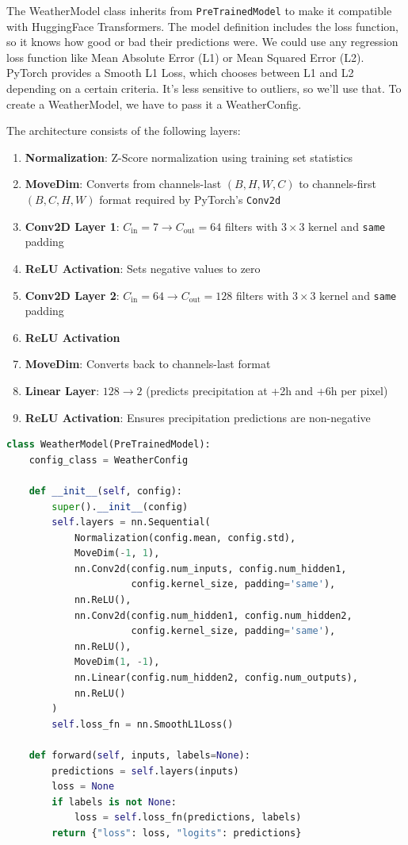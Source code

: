 \documentclass[12pt, a4paper]{report}
\begin{document}
The WeatherModel class inherits from \texttt{PreTrainedModel} to make it compatible with HuggingFace Transformers. The model definition includes the loss function, so it knows how good or bad their predictions were. We could use any regression loss function like Mean Absolute Error (L1) or Mean Squared Error (L2). PyTorch provides a Smooth L1 Loss, which chooses between L1 and L2 depending on a certain criteria. It's less sensitive to outliers, so we'll use that. To create a WeatherModel, we have to pass it a WeatherConfig.

The architecture consists of the following layers:

\begin{enumerate}
    \item \textbf{Normalization}: Z-Score normalization using training set statistics
    \item \textbf{MoveDim}: Converts from channels-last $(B, H, W, C)$ to channels-first $(B, C, H, W)$ format required by PyTorch's \texttt{Conv2d}
    \item \textbf{Conv2D Layer 1}: $C_{\text{in}} = 7 \rightarrow C_{\text{out}} = 64$ filters with $3 \times 3$ kernel and \texttt{same} padding
    \item \textbf{ReLU Activation}: Sets negative values to zero
    \item \textbf{Conv2D Layer 2}: $C_{\text{in}} = 64 \rightarrow C_{\text{out}} = 128$ filters with $3 \times 3$ kernel and \texttt{same} padding
    \item \textbf{ReLU Activation}
    \item \textbf{MoveDim}: Converts back to channels-last format
    \item \textbf{Linear Layer}: $128 \rightarrow 2$ (predicts precipitation at +2h and +6h per pixel)
    \item \textbf{ReLU Activation}: Ensures precipitation predictions are non-negative
\end{enumerate}

\begin{lstlisting}[language=Python, caption=WeatherModel forward pass and loss computation.]
class WeatherModel(PreTrainedModel):
    config_class = WeatherConfig

    def __init__(self, config):
        super().__init__(config)
        self.layers = nn.Sequential(
            Normalization(config.mean, config.std),
            MoveDim(-1, 1),
            nn.Conv2d(config.num_inputs, config.num_hidden1,
                      config.kernel_size, padding='same'),
            nn.ReLU(),
            nn.Conv2d(config.num_hidden1, config.num_hidden2,
                      config.kernel_size, padding='same'),
            nn.ReLU(),
            MoveDim(1, -1),
            nn.Linear(config.num_hidden2, config.num_outputs),
            nn.ReLU()
        )
        self.loss_fn = nn.SmoothL1Loss()

    def forward(self, inputs, labels=None):
        predictions = self.layers(inputs)
        loss = None
        if labels is not None:
            loss = self.loss_fn(predictions, labels)
        return {"loss": loss, "logits": predictions}
\end{lstlisting}
\end{document}
